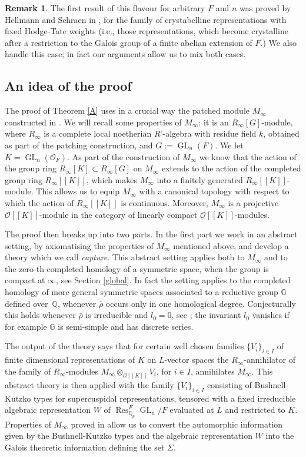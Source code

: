 \documentclass[11pt]{article}
\newcommand{\ie}{i.e.,\xspace}
\let\mathcal\mathscr
\newcommand{\ssquare}{{\scriptscriptstyle\square}}
\theoremstyle{definition}
\newtheorem{remark}[prop]{Remark}
\DeclareMathOperator{\Res}{Res}
\DeclareMathOperator{\GL}{GL}
\newcommand{\br}[1]{[\![#1]\!]}
\newcommand{\Qp}{\mathbb {Q}_p}
\newcommand{\QQ}{\mathbb Q}
\newcommand{\cO}{\mathcal{O}}
\newcommand{\rhobar}{\bar{\rho}}
\begin{document}
\begin{remark}\label{rem_HS} The first result of this flavour for arbitrary $F$ and $n$ was proved by Hellmann
and Schraen in \cite{HS}, for the family of crystabelline representations with fixed Hodge-Tate
weights (\ie those representations, which become crystalline after a restriction to the Galois group of a finite abelian extension of $F$.) We also handle this case; in fact our arguments
allow us to mix both cases.
\end{remark}

\subsection{An idea of the proof} The proof of Theorem \ref{A} uses in a crucial way the
patched module $M_{\infty}$ constructed in \cite{six-authors}. We will recall some properties of $M_{\infty}$: it is an $R_{\infty}[G]$-module,
where $R_{\infty}$ is a complete local noetherian $R^\ssquare$-algebra with residue field $k$, obtained
as part of the patching construction, and $G:=\GL_n(F)$. We let $K=\GL_n(\cO_F)$. As part of the construction of $M_\infty$ we know that the action of the group ring $R_{\infty}[K]\subset
R_{\infty}[G]$ on $M_{\infty}$ extends to the action of the completed group ring $R_{\infty}\br{K}$,
which makes $M_{\infty}$ into a finitely generated $R_{\infty}\br{K}$-module.
This allows us to equip $M_{\infty}$ with a canonical topology with respect to which the action
of $R_{\infty}\br{K}$ is continuous. Moreover, $M_{\infty}$ is
a projective $\cO\br{K}$-module in the category of linearly compact $\cO\br{K}$-modules.

The proof then breaks up into two parts. In the first part we work in an abstract setting,
by axiomatising the properties of $M_\infty$ mentioned above, and develop a theory which we call \textit{capture}. This abstract setting applies both to $M_{\infty}$ and to the zero-th completed homology of a symmetric space, when the group is compact at $\infty$, see Section \ref{global}. In fact the setting applies to the completed homology
of more general symmetric spaces associated to a reductive group $\mathbb G$ defined over~$\QQ$, whenever $\rhobar$ occurs only in one homological degree. Conjecturally this holds whenever
$\rhobar$ is irreducible and $l_0=0$, see \cite[Conj.\,3.3]{matt_icm}; the invariant $l_0$ vanishes if for example $\mathbb G$ is semi-simple and has discrete series.

The output of the theory says that for certain well chosen families $\{ V_i\}_{i\in I}$ of finite dimensional representations of $K$ on $L$-vector spaces the $R_{\infty}$-annihilator
of the family of $R_{\infty}$-modules $M_{\infty}\otimes_{\cO\br{K}} V_i$, for $i\in I$,
annihilates $M_{\infty}$. This abstract theory is then applied with the family $\{V_i\}_{i\in I}$ consisting of
Bushnell-Kutzko types for supercuspidal representations, tensored with a fixed irreducible
algebraic representation $W$ of $\Res^F_{\Qp} \GL_n/F$ evaluated at $L$ and restricted to $K$. Properties of $M_{\infty}$ proved in \cite{six-authors} allow us to convert the automorphic
information given by the Bushnell-Kutzko types and the algebraic representation $W$ into the Galois
theoretic information defining the set $\Sigma$.
\end{document}
